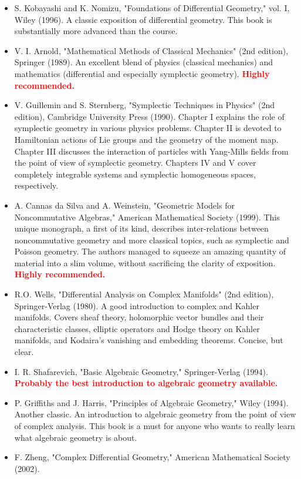 \documentclass[10pt,a4paper]{book}
\theoremstyle{definition}
\begin{document}
\begin{itemize}
\item    S. Kobayashi and K. Nomizu, "Foundations of Differential Geometry," vol. I, Wiley (1996). A classic exposition of differential geometry. This book is substantially more advanced than the course.
\item    V. I. Arnold, "Mathematical Methods of Classical Mechanics" (2nd edition), Springer (1989). An excellent blend of physics (classical mechanics) and mathematics (differential and especially symplectic geometry). \textcolor{red}{\bf Highly recommended.}
\item    V. Guillemin and S. Sternberg, "Symplectic Techniques in Physics" (2nd edition), Cambridge University Press (1990).  Chapter I explains the role of symplectic geometry in various physics problems. Chapter II is devoted to Hamiltonian actions of Lie groups and the geometry of the moment map. Chapter III discusses the interaction of particles with Yang-Mills fields from the point of view of symplectic geometry. Chapters IV and V cover completely integrable systems and symplectic homogeneous spaces, respectively.
\item    A. Cannas da Silva and A. Weinstein, "Geometric Models for Noncommutative Algebras," American Mathematical Society (1999). This unique monograph, a first of its kind, describes inter-relations between noncommutative geometry and more classical topics, such as symplectic and Poisson geometry. The authors managed to squeeze an amazing quantity of material into a slim volume, without sacrificing the clarity of exposition. \textcolor{red}{\bf Highly recommended.}
\item    R.O. Wells, "Differential Analysis on Complex Manifolds" (2nd edition), Springer-Verlag (1980). A good introduction to complex and Kahler manifolds. Covers sheaf theory, holomorphic vector bundles and their characteristic classes,  elliptic operators and Hodge theory on Kahler manifolds, and Kodaira's vanishing and embedding theorems. Concise, but clear.
\item    I. R. Shafarevich, "Basic Algebraic Geometry," Springer-Verlag (1994). \textcolor{red}{\bf Probably the best introduction to algebraic geometry available.}
\item    P. Griffiths and J. Harris, "Principles of Algebraic Geometry," Wiley (1994). Another classic. An introduction to algebraic geometry from the point of view of complex analysis. This book is a must for anyone who wants to really learn what algebraic geometry is about.
\item    F. Zheng, "Complex Differential Geometry,"  American Mathematical Society (2002).

\end{itemize}
\end{document}
